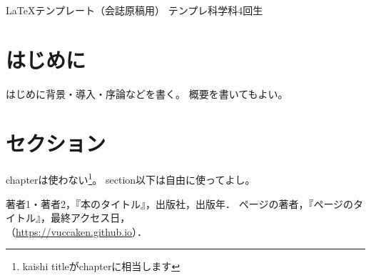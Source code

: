 \documentclass[uplatex,dvipdfmx,10pt,b5paper,papersize]{jsbook}
\begin{document}


\kaishititle%
  {\LaTeX テンプレート（会誌原稿用）}%
  {テンプレ科学科4回生}%
  {}%


\section*{はじめに}
はじめに背景・導入・序論などを書く。
概要を書いてもよい。


\section{セクション}
chapterは使わない\footnote{kaishi titleがchapterに相当します}。
section以下は自由に使ってよし。


\begin{thebibliography}{99}
   著者1・著者2，『本のタイトル』，出版社，出版年．
   ページの著者，『ページのタイトル』，最終アクセス日，\\（\url{https://vuccaken.github.io}）．
\end{thebibliography}
\end{document}
